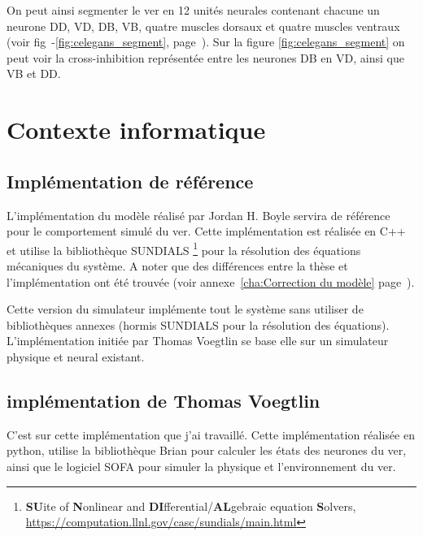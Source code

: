 On peut ainsi segmenter le ver en 12 unités neurales contenant chacune un neurone DD, VD,
DB, VB, quatre muscles dorsaux et quatre muscles ventraux (voir fig~-\ref{fig:celegans_segment},
page~\pageref{fig:celegans_segment}). Sur la figure \ref{fig:celegans_segment} on peut voir la
cross-inhibition représentée entre les neurones DB en VD, ainsi que VB et DD.



\section{Contexte informatique} %
\label{sec:Contexte informatique}

\subsection{Implémentation de référence} %
\label{sub:implémentation de référence}

L'implémentation du modèle réalisé par Jordan H. Boyle servira de référence
pour le comportement simulé du ver. Cette implémentation est réalisée en C++ et
utilise la bibliothèque SUNDIALS \footnote{\textbf{SU}ite of \textbf{N}onlinear and
\textbf{DI}fferential/\textbf{AL}gebraic equation \textbf{S}olvers,
\url{https://computation.llnl.gov/casc/sundials/main.html}} pour la résolution
des équations mécaniques du système. A noter que des différences entre la thèse
et l'implémentation ont été trouvée (voir annexe~\ref{cha:Correction du modèle}
page~\pageref{cha:Correction du modèle}).

Cette version du simulateur implémente tout le système sans utiliser de bibliothèques
annexes (hormis SUNDIALS pour la résolution des équations). L'implémentation initiée
par Thomas Voegtlin se base elle sur un simulateur physique et neural existant.


\subsection{implémentation de Thomas Voegtlin} %
\label{sub:implémentation de Thomas Voegtlin}

C'est sur cette implémentation que j'ai travaillé. Cette implémentation réalisée
en python, utilise la bibliothèque Brian\cite{Goodman2008} pour calculer les états
des neurones du ver, ainsi que le logiciel SOFA pour simuler la physique et
l'environnement du ver.

